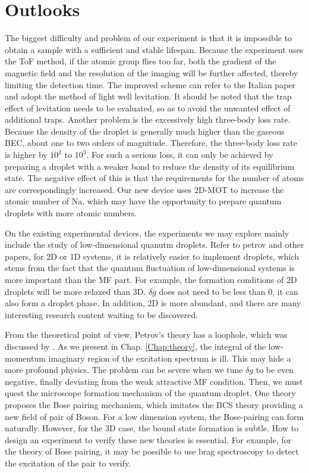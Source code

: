\section{Outlooks}
\label{sec:outlooks}

The biggest difficulty and problem of our experiment is that it is impossible to obtain a sample with a sufficient and stable lifespan. Because the experiment uses the ToF method, if the atomic group flies too far, both the gradient of the magnetic field and the resolution of the imaging will be further affected, thereby limiting the detection time. The improved scheme can refer to the Italian paper and adopt the method of light well levitation. It should be noted that the trap effect of levitation needs to be evaluated, so as to avoid the unwanted effect of additional traps. Another problem is the excessively high three-body loss rate. Because the density of the droplet is generally much higher than the gaseous BEC, about one to two orders of magnitude. Therefore, the three-body loss rate is higher by $10^2$ to $10^3$. For such a serious loss, it can only be achieved by preparing a droplet with a weaker bond to reduce the density of its equilibrium state. The negative effect of this is that the requirements for the number of atoms are correspondingly increased. Our new device uses 2D-MOT to increase the atomic number of Na, which may have the opportunity to prepare quantum droplets with more atomic numbers.

On the existing experimental devices, the experiments we may explore mainly include the study of low-dimensional quanutm droplets. Refer to petrov and other papers, for 2D or 1D systems, it is relatively easier to implement droplets, which stems from the fact that the quantum fluctuation of low-dimensional systems is more important than the MF part. For example, the formation conditions of 2D droplets will be more relaxed than 3D. $\delta g$ does not need to be less than 0, it can also form a droplet phase. In addition, 2D is more abundant, and there are many interesting research content waiting to be discovered.

From the theoretical point of view, Petrov's theory \cite{petrov2015} has a loophole, which was discussed by \cite{Hu2020, Hu2020a}. As we present in Chap. \ref{Chap:theory}, the integral of the low-momentum imaginary region of the excitation spectrum is ill. This may hide a more profound physics. The problem can be severe when we tune $\delta g$ to be even negative, finally deviating from the weak attractive MF condition. Then, we must quest the microscope formation mechanism of the quantum droplet. One theory proposes the Bose pairing mechanism, which imitates the BCS theory providing a new field of pair of Boson. For a low dimension system, the Bose-pairing can form naturally. However, for the 3D case, the bound state formation is subtle. How to design an experiment to verify these new theories is essential. For example, for the theory of Bose pairing, it may be possible to use brag spectroscopy to detect the excitation of the pair to verify.


